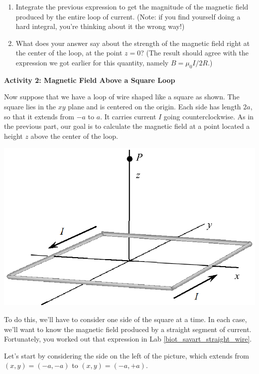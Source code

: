 \begin{enumerate}[leftmargin=0in, labelwidth=*, align=left, labelsep=0in, widest=a, itemindent=\labelwidth, label=(\emph{\alph*})]
\item \label{answer1}
Integrate the previous expression to get the magnitude of the
magnetic field produced by the entire loop of current.  (Note: if you
find yourself doing a hard integral, you're thinking about it the wrong
way!)
\answerspace{1in}

\item What does your answer say about the strength of the magnetic
field right at the center of the loop, at the point $z=0$?
(The result should agree with the expression we got earlier for 
this quantity, namely $B=\mu_0I/2R$.)
\answerspace{0.5in}

\end{enumerate}

\bigskip

{\bf Activity 2: Magnetic Field Above a Square Loop}

Now suppose that we have a loop of wire shaped like a square as shown.
The square lies in the $xy$ plane and is centered on the origin.
Each side has length $2a$, so that it extends from $-a$ to $a$.
It carries current $I$ going counterclockwise.  As in the previous
part, our goal is to calculate the magnetic field at a point 
located a height $z$ above the center of the loop.  

\vspace{0.4in}
\centerline{\includegraphics{biot_savart_above_loops/square_loop_3d.eps}}
\medskip


To do this, we'll have to consider one side of the square at a time.  In
each case, we'll want to know the magnetic field produced by 
a straight segment of current.  Fortunately, you worked out
that expression in Lab \ref{biot_savart_straight_wire}. 


Let's start by considering 
the side on the left of the picture, which extends from
$(x,y)=(-a,-a)$ to $(x,y)=(-a,+a)$.

